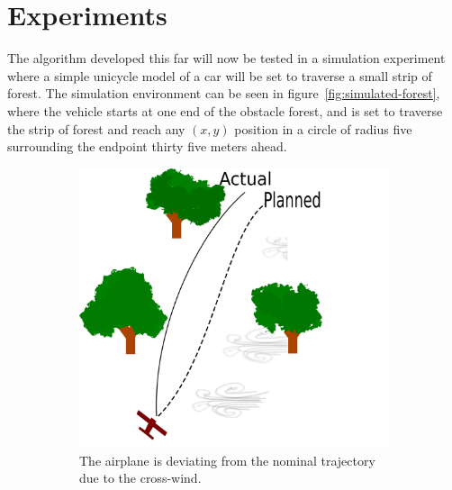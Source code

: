 \chapter{Experiments}

The \rrtfunnel{} algorithm developed this far will now be tested in a simulation
experiment where a simple unicycle model of a car will be set to traverse a
small strip of forest. The simulation environment can be seen in
figure~\cref{fig:simulated-forest}, where the vehicle starts at one end of the
obstacle forest, and is set to traverse the strip of forest and reach any
\((x,y)\) position in a circle of radius five surrounding the endpoint thirty
five meters ahead.

\begin{figure}
  \begin{subfigure}{0.5\textwidth}
    \includegraphics[width=\textwidth]{figures/experiments/experiment-setup-no-funnel}
    \caption{The airplane is deviating from the nominal trajectory due to the
      cross-wind.}
  \end{subfigure}%
  \;
  \begin{subfigure}{0.5\textwidth}

\end{subfigure}
\end{figure}
